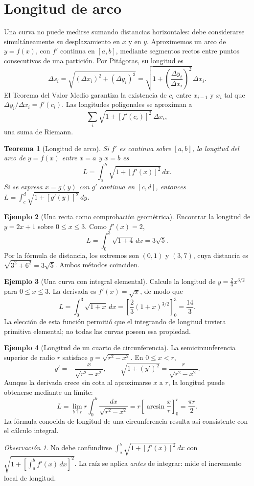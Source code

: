 \documentclass[12pt]{article}
\newtheorem{teorema}{Teorema}[section]
\theoremstyle{definition}
\newtheorem{ejemplo}[teorema]{Ejemplo}
\theoremstyle{remark}
\newtheorem*{observacion}{Observación}
\newcommand{\dd}{\,dx}
\begin{document}
\section{Longitud de arco}
Una curva no puede medirse sumando distancias horizontales: debe considerarse simultáneamente su desplazamiento en $x$ y en $y$. Aproximemos un arco de $y=f(x)$, con $f'$ continua en $[a,b]$, mediante segmentos rectos entre puntos consecutivos de una partición. Por Pitágoras, su longitud es
\[\Delta s_i=\sqrt{(\Delta x_i)^2+(\Delta y_i)^2}
=\sqrt{1+\left(\frac{\Delta y_i}{\Delta x_i}\right)^2}\,\Delta x_i.\]
El Teorema del Valor Medio garantiza la existencia de $c_i$ entre $x_{i-1}$ y $x_i$ tal que $\Delta y_i/\Delta x_i=f'(c_i)$. Las longitudes poligonales se aproximan a
\[\sum_i\sqrt{1+[f'(c_i)]^2}\,\Delta x_i,\]
una suma de Riemann.
\begin{teorema}[Longitud de arco]
Si $f'$ es continua sobre $[a,b]$, la longitud del arco de $y=f(x)$ entre $x=a$ y $x=b$ es
\[\boxed{L=\int_a^b\sqrt{1+[f'(x)]^2}\dd.}\]
Si se expresa $x=g(y)$ con $g'$ continua en $[c,d]$, entonces $L=\int_c^d\sqrt{1+[g'(y)]^2}\,dy$.
\end{teorema}
\begin{ejemplo}[Una recta como comprobación geométrica]
Encontrar la longitud de $y=2x+1$ sobre $0\le x\le3$. Como $f'(x)=2$,
\[L=\int_0^3\sqrt{1+4}\dd=3\sqrt5.\]
Por la fórmula de distancia, los extremos son $(0,1)$ y $(3,7)$, cuya distancia es $\sqrt{3^2+6^2}=3\sqrt5$. Ambos métodos coinciden.
\end{ejemplo}
\begin{ejemplo}[Una curva con integral elemental]
Calcule la longitud de $y=\frac23 x^{3/2}$ para $0\le x\le3$. La derivada es $f'(x)=\sqrt x$, de modo que
\[L=\int_0^3\sqrt{1+x}\dd
=\left[\frac23(1+x)^{3/2}\right]_0^3
=\boxed{\frac{14}{3}}.\]
La elección de esta función permitió que el integrando de longitud tuviera primitiva elemental; no todas las curvas poseen esa propiedad.
\end{ejemplo}
\begin{ejemplo}[Longitud de un cuarto de circunferencia]
La semicircunferencia superior de radio $r$ satisface $y=\sqrt{r^2-x^2}$. En $0\le x<r$,
\[y'=-\frac{x}{\sqrt{r^2-x^2}},\qquad
\sqrt{1+(y')^2}=\frac{r}{\sqrt{r^2-x^2}}.\]
Aunque la derivada crece sin cota al aproximarse $x$ a $r$, la longitud puede obtenerse mediante un límite:
\[L=\lim_{b\uparrow r}r\int_0^b\frac{dx}{\sqrt{r^2-x^2}}
=r\left[\arcsin\frac{x}{r}\right]_0^r
=\boxed{\frac{\pi r}{2}}.\]
La fórmula conocida de longitud de una circunferencia resulta así consistente con el cálculo integral.
\end{ejemplo}
\begin{observacion}
No debe confundirse $\int_a^b\sqrt{1+[f'(x)]^2}\dd$ con $\sqrt{1+\left[\int_a^b f'(x)\dd\right]^2}$. La raíz se aplica \emph{antes} de integrar: mide el incremento local de longitud.
\end{observacion}
\end{document}

